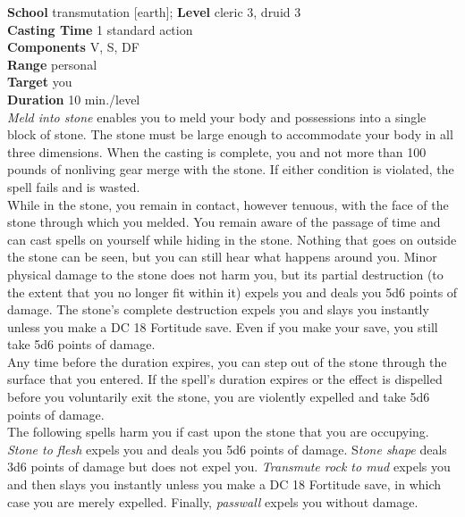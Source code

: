 \textbf{School} transmutation [earth]; \textbf{Level} cleric 3, druid 3\\
\textbf{Casting Time} 1 standard action\\
\textbf{Components} V, S, DF\\
\textbf{Range} personal\\
\textbf{Target} you\\
\textbf{Duration} 10 min./level\\
\textit{Meld into stone }enables you to meld your body and possessions into a single block of stone. The stone must be large enough to accommodate your body in all three dimensions. When the casting is complete, you and not more than 100 pounds of nonliving gear merge with the stone. If either condition is violated, the spell fails and is wasted.\\
While in the stone, you remain in contact, however tenuous, with the face of the stone through which you melded. You remain aware of the passage of time and can cast spells on yourself while hiding in the stone. Nothing that goes on outside the stone can be seen, but you can still hear what happens around you. Minor physical damage to the stone does not harm you, but its partial destruction (to the extent that you no longer fit within it) expels you and deals you 5d6 points of damage. The stone's complete destruction expels you and slays you instantly unless you make a DC 18 Fortitude save. Even if you make your save, you still take 5d6 points of damage.\\
Any time before the duration expires, you can step out of the stone through the surface that you entered. If the spell's duration expires or the effect is dispelled before you voluntarily exit the stone, you are violently expelled and take 5d6 points of damage.\\
The following spells harm you if cast upon the stone that you are occupying. \textit{Stone to flesh }expels you and deals you 5d6 points of damage. S\textit{tone shape }deals 3d6 points of damage but does not expel you. \textit{Transmute rock to mud }expels you and then slays you instantly unless you make a DC 18 Fortitude save, in which case you are merely expelled. Finally, \textit{passwall }expels you without damage.\\
